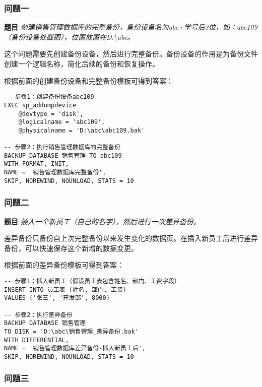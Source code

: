 \subsubsection{问题一}

\textbf{题目} \emph{创建销售管理数据库的完整备份，备份设备名为abc+学号后3位，如：abc109（备份设备处截图），位置放置在D:\textbackslash abc。}

\qquad 这个问题需要先创建备份设备，然后进行完整备份。备份设备的作用是为备份文件创建一个逻辑名称，简化后续的备份和恢复操作。

\qquad 根据前面的创建备份设备和完整备份模板可得到答案：

\begin{mdframed}[backgroundcolor=blue!5]
\begin{verbatim}
-- 步骤1：创建备份设备abc109
EXEC sp_addumpdevice
    @devtype = 'disk',
    @logicalname = 'abc109',
    @physicalname = 'D:\abc\abc109.bak'

-- 步骤2：执行销售管理数据库的完整备份
BACKUP DATABASE 销售管理 TO abc109
WITH FORMAT, INIT,
NAME = '销售管理数据库完整备份',
SKIP, NOREWIND, NOUNLOAD, STATS = 10
\end{verbatim}
\end{mdframed}

\subsubsection{问题二}

\textbf{题目} \emph{插入一个新员工（自己的名字），然后进行一次差异备份。}

\qquad 差异备份只备份自上次完整备份以来发生变化的数据页。在插入新员工后进行差异备份，可以快速保存这个新增的数据变更。

\qquad 根据前面的差异备份模板可得到答案：

\begin{mdframed}[backgroundcolor=blue!5]
\begin{verbatim}
-- 步骤1：插入新员工（假设员工表包含姓名、部门、工资字段）
INSERT INTO 员工表 (姓名, 部门, 工资)
VALUES ('张三', '开发部', 8000)

-- 步骤2：执行差异备份
BACKUP DATABASE 销售管理
TO DISK = 'D:\abc\销售管理_差异备份.bak'
WITH DIFFERENTIAL,
NAME = '销售管理数据库差异备份-插入新员工后',
SKIP, NOREWIND, NOUNLOAD, STATS = 10
\end{verbatim}
\end{mdframed}

\subsubsection{问题三}

